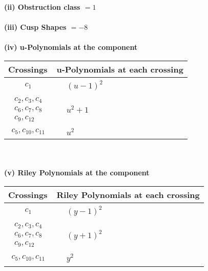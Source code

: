 \documentclass[1p]{elsarticle_modified}
\theoremstyle{definition}
\begin{document}
\flushleft \textbf{(ii) Obstruction class $= 1$}\\~\\
\flushleft \textbf{(iii) Cusp Shapes $= -8$}\\~\\
\newpage\renewcommand{\arraystretch}{1}
\flushleft \textbf{(iv) u-Polynomials at the component}\newline \\
\begin{tabular}{m{50pt}|m{274pt}}
Crossings & \hspace{64pt}u-Polynomials at each crossing \\
\hline $$\begin{aligned}c_{1}\end{aligned}$$&$\begin{aligned}
&(u-1)^2
\end{aligned}$\\
\hline $$\begin{aligned}c_{2},c_{3},c_{4}\\c_{6},c_{7},c_{8}\\c_{9},c_{12}\end{aligned}$$&$\begin{aligned}
&u^2+1
\end{aligned}$\\
\hline $$\begin{aligned}c_{5},c_{10},c_{11}\end{aligned}$$&$\begin{aligned}
&u^2
\end{aligned}$\\
\hline
\end{tabular}\\~\\
\newpage\renewcommand{\arraystretch}{1}
\flushleft \textbf{(v) Riley Polynomials at the component}\newline \\
\begin{tabular}{m{50pt}|m{274pt}}
Crossings & \hspace{64pt}Riley Polynomials at each crossing \\
\hline $$\begin{aligned}c_{1}\end{aligned}$$&$\begin{aligned}
&(y-1)^2
\end{aligned}$\\
\hline $$\begin{aligned}c_{2},c_{3},c_{4}\\c_{6},c_{7},c_{8}\\c_{9},c_{12}\end{aligned}$$&$\begin{aligned}
&(y+1)^2
\end{aligned}$\\
\hline $$\begin{aligned}c_{5},c_{10},c_{11}\end{aligned}$$&$\begin{aligned}
&y^2
\end{aligned}$\\
\hline
\end{tabular}\\~\\
\end{document}
